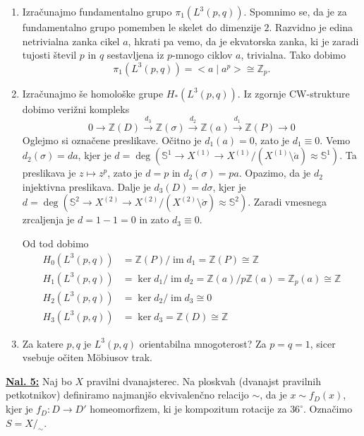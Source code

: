 \documentclass[a4paper, 12pt]{article}
\DeclareMathOperator{\im}{im}
\renewcommand{\S}{\mathbb{S}}
\newcommand{\Z}{\mathbb{Z}}
\newcommand{\iso}{\cong}
\newcommand{\homeo}{\approx}
\begin{document}
\begin{enumerate}[label=(\alph*)]
	\item Izračunajmo fundamentalno grupo $\pi_1(L^3(p, q))$. Spomnimo se, da je za fundamentalno grupo pomemben le skelet do dimenzije $2$. Razvidno je edina netrivialna zanka cikel $a$, hkrati pa vemo, da je ekvatorska zanka, ki je zaradi tujosti števil $p$ in $q$ sestavljena iz $p$-mnogo ciklov $a$, trivialna. Tako dobimo
	\[
	\pi_1(L^3(p, q)) = < a \; | \; a^p > \iso \Z_p.
	\]
	\item Izračunajmo še homološke grupe $H_*(L^3(p, q))$. Iz zgornje CW-strukture dobimo verižni kompleks
	\[
	0 \xrightarrow{} \Z(D) \xrightarrow{d_3} \Z(\sigma) \xrightarrow{d_2} \Z(a) \xrightarrow{d_1} \Z(P) \xrightarrow{} 0
	\]
	Oglejmo si označene preslikave. Očitno je $d_1(a) = 0$, zato je $d_1 \equiv 0$. Vemo $d_2(\sigma) = da$, kjer je $d = \deg\left(\S^1 \to X^{(1)} \to X^{(1)} / (X^{(1)}\setminus \mathring{a}) \homeo \S^1\right)$. Ta preslikava je $z \mapsto z^p$, zato je $d = p$ in $d_2(\sigma) = pa$. Opazimo, da je $d_2$ injektivna preslikava. Dalje je $d_3(D) = d\sigma$, kjer je $d = \deg\left(\S^2 \to X^{(2)} \to X^{(2)} / (X^{(2)}\setminus \mathring{\sigma}) \homeo \S^2\right)$. Zaradi vmesnega zrcaljenja je $d = 1 - 1 = 0$ in zato $d_3 \equiv 0$.
	
	Od tod dobimo 
	\begin{align*}
	H_0(L^3(p, q)) &= \Z(P) / \im d_1 = \Z(P) \iso \Z \\
	H_1(L^3(p, q)) &= \ker d_1 / \im d_2 = \Z(a) / p\Z(a) = \Z_p(a) \iso \Z \\
	H_2(L^3(p, q)) &= \ker d_2 / \im d_3 \iso 0 \\
	H_3(L^3(p, q)) &= \ker d_3 = \Z(D) \iso \Z
	\end{align*}
	\item Za katere $p, q$ je $L^3(p, q)$ orientabilna mnogoterost? Za $p = q = 1$, sicer vsebuje očiten M\"obiusov trak.
\end{enumerate}

\underline{\textbf{Nal. 5:}}
Naj bo $X$ pravilni dvanajsterec. Na ploskvah (dvanajst pravilnih petkotnikov) definiramo najmanjšo ekvivalenčno relacijo $\sim$, da je $x \sim f_D(x)$, kjer je $f_D \colon D \to D'$ homeomorfizem, ki je kompozitum rotacije za $36^\circ$. Označimo $S = X/_\sim$.
\end{document}
